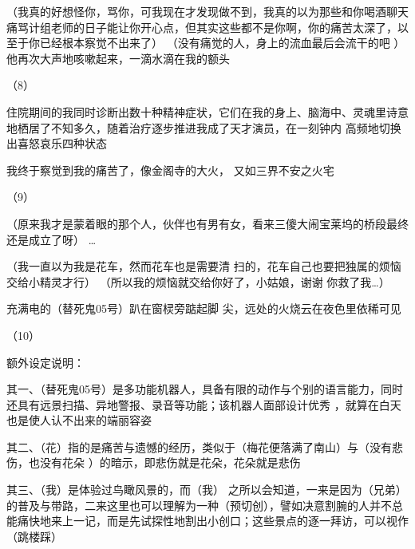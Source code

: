 \documentclass{article}
\begin{document}
（我真的好想怪你，骂你，可我现在才发现做不到，我真的以为那些和你喝酒聊天痛骂计组老师的日子能让你开心点，但其实这些都不是你啊，你的痛苦太深了，以至于你已经根本察觉不出来了）
（没有痛觉的人，身上的流血最后会流干的吧
\newpage
）
他再次大声地咳嗽起来，一滴水滴在我的额头
 


（8） 

住院期间的我同时诊断出数十种精神症状，它们在我的身上、脑海中、灵魂里诗意地栖居了不知多久，随着治疗逐步推进我成了天才演员，在一刻钟内
高频地切换出喜怒哀乐四种状态 

我终于察觉到我的痛苦了，像金阁寺的大火，
又如三界不安之火宅 


（9） 

（原来我才是蒙着眼的那个人，伙伴也有男有女，看来三傻大闹宝莱坞的桥段最终还是成立了呀）
… 

（我一直以为我是花车，然而花车也是需要清
\newpage
扫的，花车自己也要把独属的烦恼交给小精灵才行）
（所以我的烦恼就交给你好了，小姑娘，谢谢
你救了我…） 

充满电的（替死鬼05号）趴在窗棂旁踮起脚
尖，远处的火烧云在夜色里依稀可见 


（10） 


额外设定说明： 

其一、（替死鬼05号）是多功能机器人，具备有限的动作与个别的语言能力，同时还具有远景扫描、异地警报、录音等功能；该机器人面部设计优秀
，就算在白天也是使人认不出来的端丽容姿 

其二、（花）指的是痛苦与遗憾的经历，类似于（梅花便落满了南山）与（没有悲伤，也没有花朵
）的暗示，即悲伤就是花朵，花朵就是悲伤 

其三、（我）是体验过鸟瞰风景的，而（我）
\newpage
之所以会知道，一来是因为（兄弟）的普及与带路，二来这里也可以理解为一种（预切创），譬如决意割腕的人并不总能痛快地来上一记，而是先试探性地割出小创口；这些景点的逐一拜访，可以视作（跳楼踩）
\end{document}
